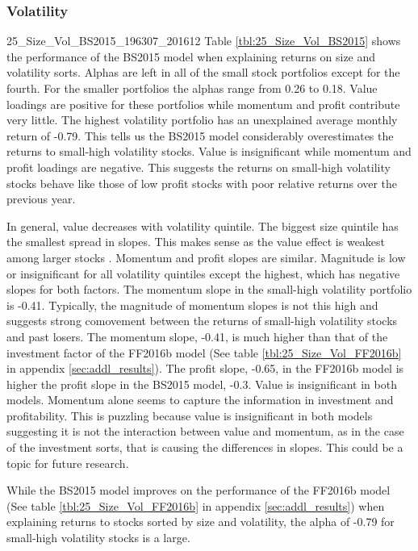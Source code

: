 \subsubsection{Volatility}

{25_Size_Vol_BS2015_196307_201612}
Table \ref{tbl:25_Size_Vol_BS2015} shows the performance of the BS2015 model when
explaining returns on size and volatility sorts. Alphas are left in all of the small stock
portfolios except for the fourth. For the smaller portfolios the alphas range from 0.26 to
0.18. Value loadings are positive for these portfolios while momentum and profit
contribute very little. The highest volatility portfolio has an unexplained average
monthly return of -0.79. This tells us the BS2015 model considerably overestimates the
returns to small-high volatility stocks. Value is insignificant while momentum and profit
loadings are negative. This suggests the returns on small-high volatility stocks behave
like those of low profit stocks with poor relative returns over the previous year.

In general, value decreases with volatility quintile. The biggest size quintile has the
smallest spread in slopes. This makes sense as the value effect is weakest among larger
stocks \parencite{asness2015fact}. Momentum and profit slopes are similar. Magnitude is
low or insignificant for all volatility quintiles except the highest, which has negative
slopes for both factors. The momentum slope in the small-high volatility portfolio is
-0.41. Typically, the magnitude of momentum slopes is not this high and suggests strong
comovement between the returns of small-high volatility stocks and past losers. The
momentum slope, -0.41, is much higher than that of the investment factor of the FF2016b
model (See table \ref{tbl:25_Size_Vol_FF2016b} in appendix \ref{sec:addl_results}). The
profit slope, -0.65, in the FF2016b model is higher the profit slope in the BS2015 model,
-0.3. Value is insignificant in both models. Momentum alone seems to capture the
information in investment and profitability. This is puzzling because value is
insignificant in both models suggesting it is not the interaction between value and
momentum, as in the case of the investment sorts, that is causing the differences in
slopes. This could be a topic for future research.

While the BS2015 model improves on the performance of the FF2016b model (See table
\ref{tbl:25_Size_Vol_FF2016b} in appendix \ref{sec:addl_results}) when explaining returns
to stocks sorted by size and volatility, the alpha of -0.79 for small-high volatility
stocks is a large.


